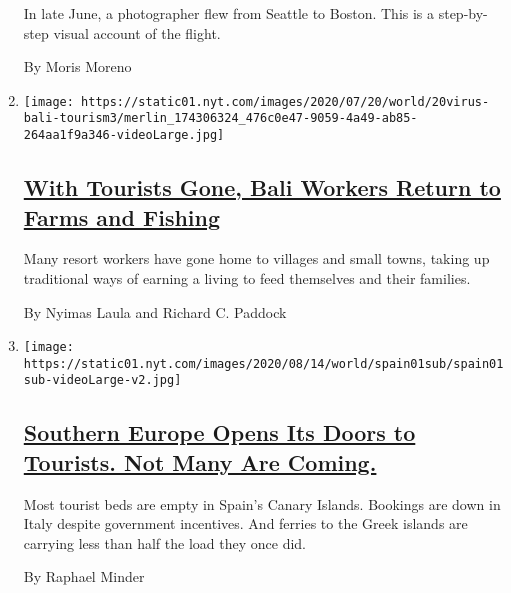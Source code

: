 \begin{enumerate}
  In late June, a photographer flew from Seattle to Boston. This is a
  step-by-step visual account of the flight.

  By Moris Moreno
\item
  \texttt{[image: https://static01.nyt.com/images/2020/07/20/world/20virus-bali-tourism3/merlin\_174306324\_476c0e47-9059-4a49-ab85-264aa1f9a346-videoLarge.jpg]}

  \hypertarget{with-tourists-gone-bali-workers-return-to-farms-and-fishing}{%
  \subsection{\texorpdfstring{\href{/2020/07/20/world/asia/bali-tourism-coronavirus.html}{With
  Tourists Gone, Bali Workers Return to Farms and
  Fishing}}{With Tourists Gone, Bali Workers Return to Farms and Fishing}}\label{with-tourists-gone-bali-workers-return-to-farms-and-fishing}}

  Many resort workers have gone home to villages and small towns, taking
  up traditional ways of earning a living to feed themselves and their
  families.

  By Nyimas Laula and Richard C. Paddock
\item
  \texttt{[image: https://static01.nyt.com/images/2020/08/14/world/spain01sub/spain01sub-videoLarge-v2.jpg]}

  \hypertarget{southern-europe-opens-its-doors-to-tourists-not-many-are-coming}{%
  \subsection{\texorpdfstring{\href{/2020/07/19/world/europe/tourism-virus-europe.html}{Southern
  Europe Opens Its Doors to Tourists. Not Many Are
  Coming.}}{Southern Europe Opens Its Doors to Tourists. Not Many Are Coming.}}\label{southern-europe-opens-its-doors-to-tourists-not-many-are-coming}}

  Most tourist beds are empty in Spain's Canary Islands. Bookings are
  down in Italy despite government incentives. And ferries to the Greek
  islands are carrying less than half the load they once did.

  By Raphael Minder
\end{enumerate}

